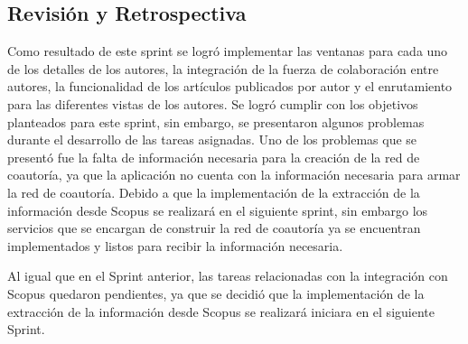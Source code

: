 \subsection{Revisión y Retrospectiva}
Como resultado de este sprint se logró implementar las ventanas para cada uno de los detalles de los autores, la integración de la fuerza de colaboración entre autores, la funcionalidad de los artículos publicados por autor y el enrutamiento para las diferentes vistas de los autores.
Se logró cumplir con los objetivos planteados para este sprint, sin embargo, se presentaron algunos problemas durante el desarrollo de las tareas asignadas.
Uno de los problemas que se presentó fue la falta de información necesaria para la creación de la red de coautoría, ya que la aplicación no cuenta con la información necesaria para armar la red de coautoría.
Debido a que la implementación de la extracción de la información desde Scopus se realizará en el siguiente sprint, sin embargo los servicios que se encargan de construir la red de coautoría ya se encuentran implementados y listos para recibir la información necesaria.

Al igual que en el Sprint anterior, las tareas relacionadas con la integración con Scopus quedaron pendientes, ya que se decidió que la implementación de la extracción de la información desde Scopus se realizará iniciara en el siguiente Sprint.